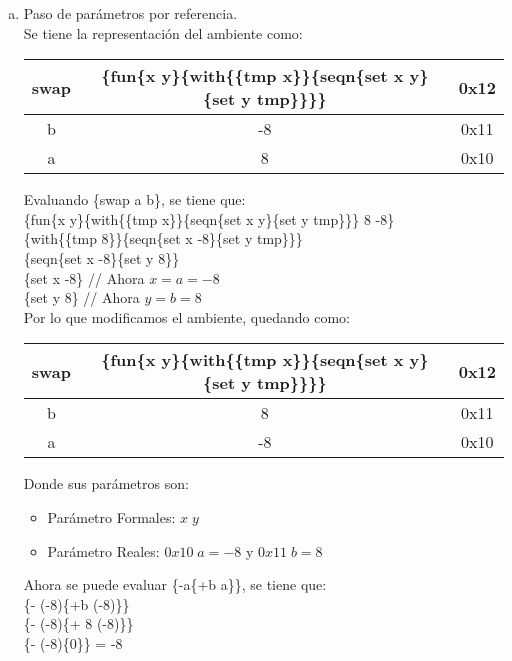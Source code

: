 \begin{enumerate}[a.]
\newpage
\item Paso de parámetros por referencia.\\
Se tiene la representación del ambiente como:

\begin{table}[h]
\centering
\renewcommand{\arraystretch}{1.5}
\begin{tabular}{ |c | c c |}
\hline
\textbf{swap} &
\textbf{ \{fun\{x y\}\{with\{\{tmp x\}\}\{seqn\{set x y\}\{set y tmp\}\}\}\} } & 0x12\\
\hline
b & -8  & 0x11\\
\hline
a & 8  & 0x10\\
\hline
\end{tabular}
\end{table}
Evaluando \{swap a b\}, se tiene que:\\

\{fun\{x y\}\{with\{\{tmp x\}\}\{seqn\{set x y\}\{set y tmp\}\}\} 8 -8\} \\
\{with\{\{tmp 8\}\}\{seqn\{set x -8\}\{set y tmp\}\}\} \\
\{seqn\{set x -8\}\{set y 8\}\} \\
\{set x -8\} // Ahora $x=a=-8$\\
\{set y 8\} // Ahora $y=b=8$\\

Por lo que modificamos el ambiente, quedando como:\\
\begin{table}[h]
\centering
\renewcommand{\arraystretch}{1.5}
\begin{tabular}{ |c | c c |}
\hline
\textbf{swap} &
\textbf{ \{fun\{x y\}\{with\{\{tmp x\}\}\{seqn\{set x y\}\{set y tmp\}\}\}\} } & 0x12\\
\hline
b & 8  & 0x11\\
\hline
a & -8  & 0x10\\
\hline
\end{tabular}
\end{table}

Donde sus parámetros son:
\begin{itemize}
    \item Parámetro Formales: $x \; y$
    \item Parámetro Reales: $0x10 \; a=-8$ y $0x11 \; b=8$
\end{itemize}

Ahora se puede evaluar \{-a\{+b a\}\}, se tiene que:\\
\{- (-8)\{+b (-8)\}\} \\
\{- (-8)\{+ 8 (-8)\}\} \\
\{- (-8)\{0\}\} = -8 \\
\end{enumerate}

